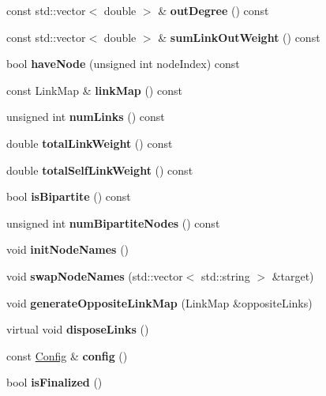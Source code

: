 \begin{DoxyCompactItemize}
const std\+::vector$<$ double $>$ \& {\bfseries out\+Degree} () const
\item 
\mbox{\label{classNetwork_aad0c228dcbdb36d0bd14ca518bab268b}} 
const std\+::vector$<$ double $>$ \& {\bfseries sum\+Link\+Out\+Weight} () const
\item 
\mbox{\label{classNetwork_aed19d67bf781dc9f8d2420111c1160b6}} 
bool {\bfseries have\+Node} (unsigned int node\+Index) const
\item 
\mbox{\label{classNetwork_a13284a11be1a37744f1c8014f940cd35}} 
const Link\+Map \& {\bfseries link\+Map} () const
\item 
\mbox{\label{classNetwork_ae88d213dc2567782a7c32b2d7649f465}} 
unsigned int {\bfseries num\+Links} () const
\item 
\mbox{\label{classNetwork_a8c0e2b1a5f11881052da39e53c4dce8c}} 
double {\bfseries total\+Link\+Weight} () const
\item 
\mbox{\label{classNetwork_a8e9a8b0aa41a75037868cf05af24e5c7}} 
double {\bfseries total\+Self\+Link\+Weight} () const
\item 
\mbox{\label{classNetwork_ae605ef1109ddf7f13dcd94b1f03a4a68}} 
bool {\bfseries is\+Bipartite} () const
\item 
\mbox{\label{classNetwork_a99580240387afa26f4c4f8eab12d2122}} 
unsigned int {\bfseries num\+Bipartite\+Nodes} () const
\item 
\mbox{\label{classNetwork_afa36b11b8e6ae0f7e123f299a5c18dd6}} 
void {\bfseries init\+Node\+Names} ()
\item 
\mbox{\label{classNetwork_a48972511b804b9f3e24e5acef580d149}} 
void {\bfseries swap\+Node\+Names} (std\+::vector$<$ std\+::string $>$ \&target)
\item 
\mbox{\label{classNetwork_a202d38d6cbd9f06cbd9cdddec14c7680}} 
void {\bfseries generate\+Opposite\+Link\+Map} (Link\+Map \&opposite\+Links)
\item 
\mbox{\label{classNetwork_a608f4113f8e7558bcf7a7991b9c61f18}} 
virtual void {\bfseries dispose\+Links} ()
\item 
\mbox{\label{classNetwork_a47390453870914536a44d2404e0b9b85}} 
const \mbox{\hyperlink{structConfig}{Config}} \& {\bfseries config} ()
\item 
\mbox{\label{classNetwork_a93b6b65d803d62bd019e830fc1d074a7}} 
bool {\bfseries is\+Finalized} ()
\end{DoxyCompactItemize}
